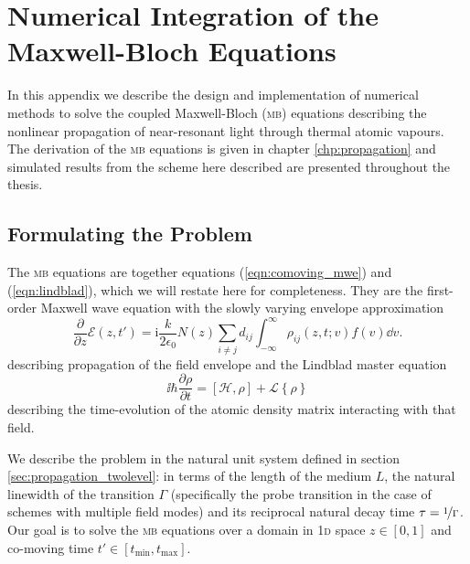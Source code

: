 \chapter[Numerical Integration of the Maxwell-Bloch Equations]
  {Numerical Integration of the\\ Maxwell-Bloch Equations}
  \label{apx:mb_eqns}


    In this appendix we describe the design and implementation of numerical
    methods to solve the coupled Maxwell-Bloch (\textsc{mb}) equations
    describing the nonlinear propagation of near-resonant light through thermal
    atomic vapours. The derivation of the \textsc{mb} equations is given in
    chapter \ref{chp:propagation} and simulated results from the scheme here
    described are presented throughout the thesis.

  \section{Formulating the Problem}

    The \textsc{mb} equations are together equations (\ref{eqn:comoving_mwe})
    and (\ref{eqn:lindblad}), which we will restate here for completeness. They
    are the first-order Maxwell wave equation with the slowly varying envelope
    approximation
    \begin{equation*}
      \frac{\partial}{\partial z} \mathcal{E}(z,t') = 
        \mathrm{i} \frac{k}{2 \epsilon_0}
        N(z) \sum_{i \ne j} d_{ij} \int_{-\infty}^{\infty} 
          \rho_{ij}(z,t; v) f(v) {\dd v}. 
    \end{equation*}
    describing propagation of the field envelope and the Lindblad master
    equation
    \begin{equation*}
      \ii \hbar \frac{\partial \rho}{\partial t} = [\mathcal{H}, \rho] + 
        \mathcal{L}\left\{ \rho \right\}
    \end{equation*}
    describing the time-evolution of the atomic density matrix interacting with
    that field.

    We describe the problem in the natural unit system defined in section
    \ref{sec:propagation_twolevel}: in terms of the length of the medium $L$,
    the natural linewidth of the transition $\Gamma$ (specifically the probe
    transition in the case of schemes with multiple field modes) and its
    reciprocal natural decay time $\tau = \nicefrac{1}{\Gamma}$. Our goal is to
    solve the \textsc{mb} equations over a domain in \textsc{1d} space $z \in
    [0, 1]$ and co-moving time $t' \in [t_{\mathrm{min}}, t_{\mathrm{max}}]$.

